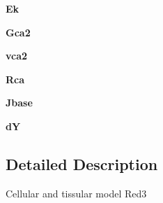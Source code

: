 \begin{DoxyCompactItemize}
\item 
\hypertarget{classcell__mdl_1_1_red3_acbf7f480b7d4d43df681879f7cccbd77}{
{\bfseries Ek}}
\label{classcell__mdl_1_1_red3_acbf7f480b7d4d43df681879f7cccbd77}

\item 
\hypertarget{classcell__mdl_1_1_red3_a717bbb86c8afe169ebbf84b4f01998a8}{
{\bfseries Gca2}}
\label{classcell__mdl_1_1_red3_a717bbb86c8afe169ebbf84b4f01998a8}

\item 
\hypertarget{classcell__mdl_1_1_red3_aa783a2b833729df8570b0f66be441529}{
{\bfseries vca2}}
\label{classcell__mdl_1_1_red3_aa783a2b833729df8570b0f66be441529}

\item 
\hypertarget{classcell__mdl_1_1_red3_a99e0a0d42db1d5146e1db7d9def4d875}{
{\bfseries Rca}}
\label{classcell__mdl_1_1_red3_a99e0a0d42db1d5146e1db7d9def4d875}

\item 
\hypertarget{classcell__mdl_1_1_red3_a069197a6f80b4b40b374f98744011311}{
{\bfseries Jbase}}
\label{classcell__mdl_1_1_red3_a069197a6f80b4b40b374f98744011311}

\item 
\hypertarget{classcell__mdl_1_1_red3_a90011e7d69aec5376e286b72ae9e0730}{
{\bfseries dY}}
\label{classcell__mdl_1_1_red3_a90011e7d69aec5376e286b72ae9e0730}

\end{DoxyCompactItemize}


\subsection{Detailed Description}
\begin{DoxyVerb}Cellular and tissular model Red3\end{DoxyVerb}
 

